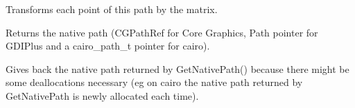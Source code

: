 
Transforms each point of this path by the matrix.

\label{wxgraphicspathgetnativepath}


Returns the native path (CGPathRef for Core Graphics, Path pointer for GDIPlus and a cairo\_path\_t pointer for cairo).

\label{wxgraphicspathungetnativepath}


Gives back the native path returned by GetNativePath() because there might be some deallocations necessary (eg on cairo the native path returned by 
GetNativePath is newly allocated each time).

